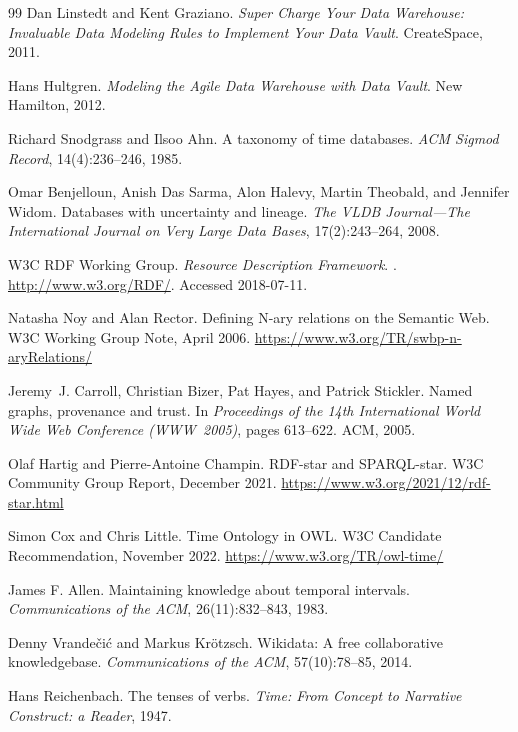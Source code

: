 \documentclass[a4paper,fleqn]{cas-sc}
\begin{document}
\begin{thebibliography}{99}
Dan Linstedt and Kent Graziano.
\newblock \emph{Super Charge Your Data Warehouse: Invaluable Data Modeling Rules to Implement Your Data Vault}.
\newblock CreateSpace, 2011.

Hans Hultgren.
\newblock \emph{Modeling the Agile Data Warehouse with Data Vault}.
\newblock New Hamilton, 2012.

Richard Snodgrass and Ilsoo Ahn.
\newblock A taxonomy of time databases.
\newblock \emph{ACM Sigmod Record}, 14(4):236--246, 1985.

Omar Benjelloun, Anish Das Sarma, Alon Halevy, Martin Theobald, and Jennifer Widom.
\newblock Databases with uncertainty and lineage.
\newblock \emph{The VLDB Journal---The International Journal on Very Large Data Bases}, 17(2):243--264, 2008.

W3C RDF Working Group.
\newblock \emph{Resource Description Framework}.
. \url{http://www.w3.org/RDF/}. Accessed 2018-07-11.

Natasha Noy and Alan Rector.
\newblock Defining N-ary relations on the Semantic Web.
\newblock W3C Working Group Note, April 2006.
\newblock \url{https://www.w3.org/TR/swbp-n-aryRelations/}

Jeremy~J. Carroll, Christian Bizer, Pat Hayes, and Patrick Stickler.
\newblock Named graphs, provenance and trust.
\newblock In \emph{Proceedings of the 14th International World Wide Web Conference (WWW~2005)}, pages 613--622. ACM, 2005.

Olaf Hartig and Pierre-Antoine Champin.
\newblock RDF-star and SPARQL-star.
\newblock W3C Community Group Report, December 2021.
\newblock \url{https://www.w3.org/2021/12/rdf-star.html}

Simon Cox and Chris Little.
\newblock Time Ontology in OWL.
\newblock W3C Candidate Recommendation, November 2022.
\newblock \url{https://www.w3.org/TR/owl-time/}

James F. Allen.
\newblock Maintaining knowledge about temporal intervals.
\newblock \emph{Communications of the ACM}, 26(11):832--843, 1983.

Denny Vrande\v{c}i\'{c} and Markus Kr\"otzsch.
\newblock Wikidata: A free collaborative knowledgebase.
\newblock \emph{Communications of the ACM}, 57(10):78--85, 2014.

Hans Reichenbach.
\newblock The tenses of verbs.
\newblock \emph{Time: From Concept to Narrative Construct: a Reader}, 1947.


\end{thebibliography}
\end{document}
